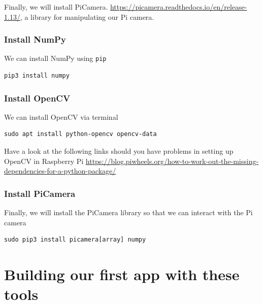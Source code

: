 Finally, we will install PiCamera. \url{https://picamera.readthedocs.io/en/release-1.13/}, a library for manipulating our Pi camera.


\subsubsection{Install NumPy}

We can install NumPy using \lstinline{pip}

\begin{lstlisting}
pip3 install numpy
\end{lstlisting}

\subsubsection{Install OpenCV}

We can install OpenCV via terminal

\begin{lstlisting}
sudo apt install python-opencv opencv-data
\end{lstlisting}

\begin{framed}
\begin{remark}

Have a look at the following links should you have problems in setting up OpenCV in Raspberry Pi
\url{https://blog.piwheels.org/how-to-work-out-the-missing-dependencies-for-a-python-package/}
\end{remark}
\end{framed}

\subsubsection{Install PiCamera}

Finally, we will install the PiCamera library so that we can interact with the Pi camera

\begin{lstlisting}
sudo pip3 install picamera[array] numpy
\end{lstlisting}

\section{Building our first app with these tools}






